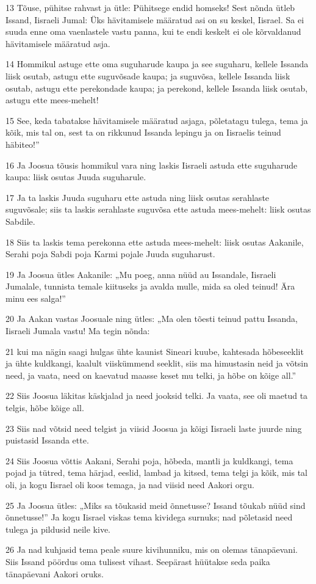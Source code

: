 \par 13 Tõuse, pühitse rahvast ja ütle: Pühitsege endid homseks! Sest nõnda ütleb Issand, Iisraeli Jumal: Üks hävitamisele määratud asi on su keskel, Iisrael. Sa ei suuda enne oma vaenlastele vastu panna, kui te endi keskelt ei ole kõrvaldanud hävitamisele määratud asja.
\par 14 Hommikul astuge ette oma suguharude kaupa ja see suguharu, kellele Issanda liisk osutab, astugu ette suguvõsade kaupa; ja suguvõsa, kellele Issanda liisk osutab, astugu ette perekondade kaupa; ja perekond, kellele Issanda liisk osutab, astugu ette mees-mehelt!
\par 15 See, keda tabatakse hävitamisele määratud asjaga, põletatagu tulega, tema ja kõik, mis tal on, sest ta on rikkunud Issanda lepingu ja on Iisraelis teinud häbiteo!”
\par 16 Ja Joosua tõusis hommikul vara ning laskis Iisraeli astuda ette suguharude kaupa: liisk osutas Juuda suguharule.
\par 17 Ja ta laskis Juuda suguharu ette astuda ning liisk osutas serahlaste suguvõsale; siis ta laskis serahlaste suguvõsa ette astuda mees-mehelt: liisk osutas Sabdile.
\par 18 Siis ta laskis tema perekonna ette astuda mees-mehelt: liisk osutas Aakanile, Serahi poja Sabdi poja Karmi pojale Juuda suguharust.
\par 19 Ja Joosua ütles Aakanile: „Mu poeg, anna nüüd au Issandale, Iisraeli Jumalale, tunnista temale kiituseks ja avalda mulle, mida sa oled teinud! Ära minu ees salga!”
\par 20 Ja Aakan vastas Joosuale ning ütles: „Ma olen tõesti teinud pattu Issanda, Iisraeli Jumala vastu! Ma tegin nõnda:
\par 21 kui ma nägin saagi hulgas ühte kaunist Sineari kuube, kahtesada hõbeseeklit ja ühte kuldkangi, kaalult viiskümmend seeklit, siis ma himustasin neid ja võtsin need, ja vaata, need on kaevatud maasse keset mu telki, ja hõbe on kõige all.”
\par 22 Siis Joosua läkitas käskjalad ja need jooksid telki. Ja vaata, see oli maetud ta telgis, hõbe kõige all.
\par 23 Siis nad võtsid need telgist ja viisid Joosua ja kõigi Iisraeli laste juurde ning puistasid Issanda ette.
\par 24 Siis Joosua võttis Aakani, Serahi poja, hõbeda, mantli ja kuldkangi, tema pojad ja tütred, tema härjad, eeslid, lambad ja kitsed, tema telgi ja kõik, mis tal oli, ja kogu Iisrael oli koos temaga, ja nad viisid need Aakori orgu.
\par 25 Ja Joosua ütles: „Miks sa tõukasid meid õnnetusse? Issand tõukab nüüd sind õnnetusse!” Ja kogu Iisrael viskas tema kividega surnuks; nad põletasid need tulega ja pildusid neile kive.
\par 26 Ja nad kuhjasid tema peale suure kivihunniku, mis on olemas tänapäevani. Siis Issand pöördus oma tulisest vihast. Seepärast hüütakse seda paika tänapäevani Aakori oruks.

